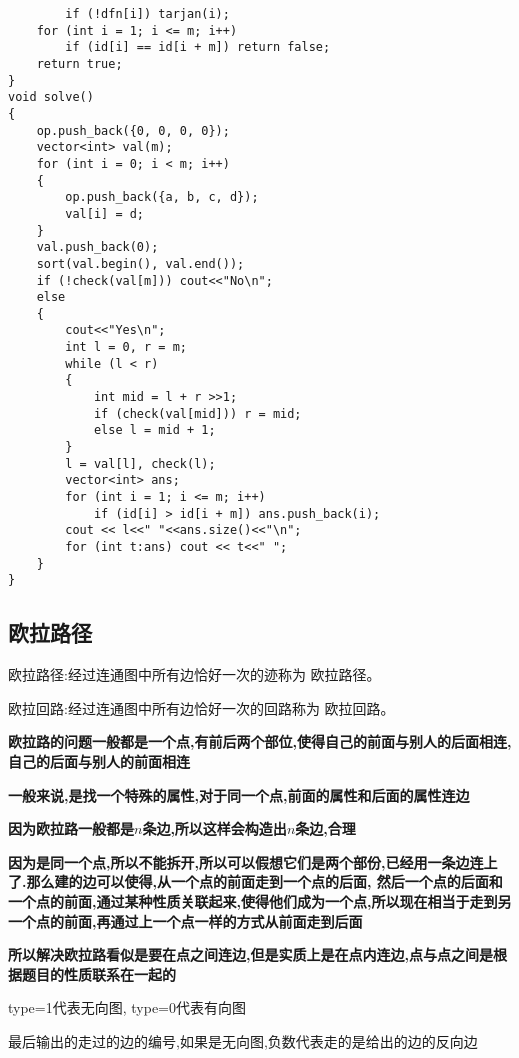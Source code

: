 \documentclass[a4paper, fontset=none]{ctexart}
\begin{document}
\begin{verbatim}
        if (!dfn[i]) tarjan(i);
    for (int i = 1; i <= m; i++)
        if (id[i] == id[i + m]) return false;
    return true;
}
void solve()
{
    op.push_back({0, 0, 0, 0});
    vector<int> val(m);
    for (int i = 0; i < m; i++)
    {
        op.push_back({a, b, c, d});
        val[i] = d;
    }
    val.push_back(0);
    sort(val.begin(), val.end());
    if (!check(val[m])) cout<<"No\n";
    else
    {
        cout<<"Yes\n";
        int l = 0, r = m;
        while (l < r)
        {
            int mid = l + r >>1;
            if (check(val[mid])) r = mid;
            else l = mid + 1;
        }
        l = val[l], check(l);
        vector<int> ans;
        for (int i = 1; i <= m; i++)
            if (id[i] > id[i + m]) ans.push_back(i);
        cout << l<<" "<<ans.size()<<"\n";
        for (int t:ans) cout << t<<" ";
    }
}
\end{verbatim}

\subsection{欧拉路径}

欧拉路径:经过连通图中所有边恰好一次的迹称为 欧拉路径。

欧拉回路:经过连通图中所有边恰好一次的回路称为 欧拉回路。

\textbf{欧拉路的问题一般都是一个点,有前后两个部位,使得自己的前面与别人的后面相连,自己的后面与别人的前面相连}

\textbf{一般来说,是找一个特殊的属性,对于同一个点,前面的属性和后面的属性连边}

\textbf{因为欧拉路一般都是$n$条边,所以这样会构造出$n$条边,合理}

\textbf{因为是同一个点,所以不能拆开,所以可以假想它们是两个部份,已经用一条边连上了.那么建的边可以使得,从一个点的前面走到一个点的后面,
然后一个点的后面和一个点的前面,通过某种性质关联起来,使得他们成为一个点,所以现在相当于走到另一个点的前面,再通过上一个点一样的方式从前面走到后面}

\textbf{所以解决欧拉路看似是要在点之间连边,但是实质上是在点内连边,点与点之间是根据题目的性质联系在一起的}

type=1代表无向图, type=0代表有向图

最后输出的走过的边的编号,如果是无向图,负数代表走的是给出的边的反向边
\end{document}
